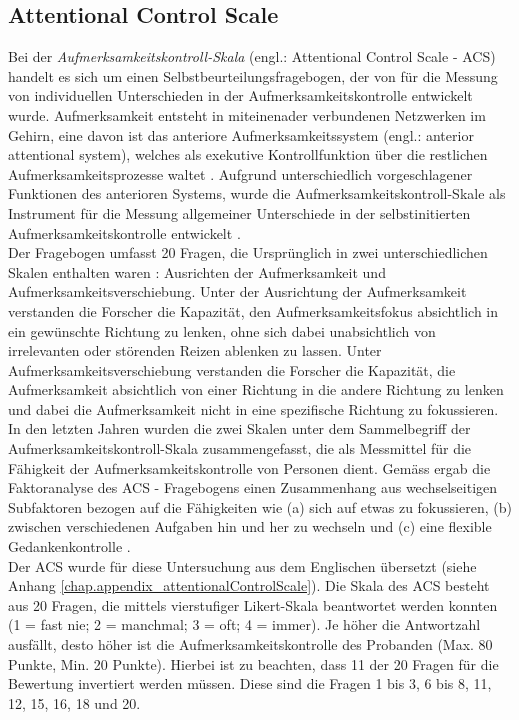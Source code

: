 \subsection{Attentional Control Scale} \label{subsection.acs}
Bei der \textit{Aufmerksamkeitskontroll-Skala} (engl.: Attentional Control Scale - ACS) handelt es sich um einen Selbstbeurteilungsfragebogen, der von  für die Messung von individuellen Unterschieden in der Aufmerksamkeitskontrolle entwickelt wurde. Aufmerksamkeit entsteht in miteinenader verbundenen Netzwerken im Gehirn, eine davon ist das anteriore Aufmerksamkeitssystem (engl.: anterior attentional system), welches als exekutive Kontrollfunktion über die restlichen Aufmerksamkeitsprozesse waltet \cite{Posner1998}. Aufgrund unterschiedlich vorgeschlagener Funktionen des anterioren Systems, wurde die Aufmerksamkeitskontroll-Skale als Instrument für die Messung allgemeiner Unterschiede in der selbstinitierten Aufmerksamkeitskontrolle entwickelt \cite{Derryberry2001}.\\
Der Fragebogen umfasst 20 Fragen, die Ursprünglich in zwei unterschiedlichen Skalen enthalten waren \cite{Derryberry1988}: Ausrichten der Aufmerksamkeit und Aufmerksamkeitsverschiebung. Unter der Ausrichtung der Aufmerksamkeit verstanden die Forscher die Kapazität, den Aufmerksamkeitsfokus absichtlich in ein gewünschte Richtung zu lenken, ohne sich dabei unabsichtlich von irrelevanten oder störenden Reizen ablenken zu lassen. Unter Aufmerksamkeitsverschiebung verstanden die Forscher die Kapazität, die Aufmerksamkeit absichtlich von einer Richtung in die andere Richtung zu lenken und dabei die Aufmerksamkeit nicht in eine spezifische Richtung zu fokussieren. In den letzten Jahren wurden die zwei Skalen unter dem Sammelbegriff der Aufmerksamkeitskontroll-Skala zusammengefasst, die als Messmittel für die Fähigkeit der Aufmerksamkeitskontrolle von Personen dient. Gemäss  ergab die Faktoranalyse des ACS - Fragebogens einen Zusammenhang aus wechselseitigen Subfaktoren bezogen auf die Fähigkeiten wie (a) sich auf etwas zu fokussieren, (b) zwischen verschiedenen Aufgaben hin und her zu wechseln und (c) eine flexible Gedankenkontrolle \cite[S.~226]{Derryberry2002}. \\
Der ACS wurde für diese Untersuchung aus dem Englischen übersetzt (siehe Anhang \ref{chap.appendix_attentionalControlScale}). Die Skala des ACS besteht aus 20 Fragen, die mittels vierstufiger Likert-Skala beantwortet werden konnten (1 = fast nie; 2 = manchmal; 3 = oft; 4 = immer). Je höher die Antwortzahl ausfällt, desto höher ist die Aufmerksamkeitskontrolle des Probanden (Max. 80 Punkte, Min. 20 Punkte). Hierbei ist zu beachten, dass 11 der 20 Fragen für die Bewertung invertiert werden müssen. Diese sind die Fragen 1 bis 3, 6 bis 8, 11, 12, 15, 16, 18 und 20.

